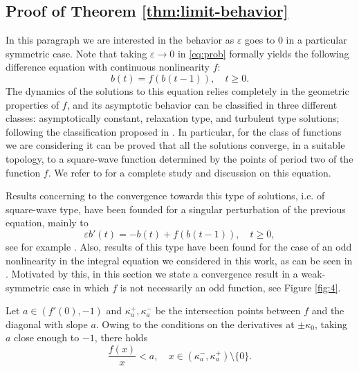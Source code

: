 \documentclass[a4paper,11pt]{article}
\theoremstyle{plain}
\theoremstyle{definition}
\theoremstyle{definition}
\numberwithin{equation}{section}
\begin{document}
\subsection{Proof of Theorem \ref{thm:limit-behavior}}

In this paragraph we are interested in the behavior as $\varepsilon$ goes to 0 in a particular symmetric case. Note that taking $\varepsilon\to 0$ in \eqref{eq:prob} formally yields the following difference equation with continuous nonlinearity $f$: 
\[
    b(t) = f(b(t-1)), \quad t\geq 0.
\]
The dynamics of the solutions to this equation relies completely in the geometric properties of $f$, and its asymptotic behavior can be classified in three different classes: asymptotically constant, relaxation type, and turbulent type solutions; following the classification proposed in \cite{sharkovsky2}. In particular, for the class of functions we are considering it can be proved that all the solutions converge, in a suitable topology, to a square-wave function determined by the points of period two of the function $f$. We refer to  \cite{sharkovsky1} for a complete study and discussion on this equation.

Results concerning to the convergence towards this type of solutions, i.e. of square-wave type, have been founded for a singular perturbation of the previous equation, mainly to
\[
    \varepsilon b'(t) = -b(t) + f(b(t-1)), \quad t\geq 0,
\]
see for example \cite{sharkovsky1,nussbaum_mallet}. Also, results of this type have been found for the case of an odd nonlinearity in the integral equation we considered in this work, as can be seen in \cite{CDM}. Motivated by this, in this section we state a convergence result in a weak-symmetric case in which $f$ is not necessarily an odd function, see Figure \ref{fig:4}.

Let $a\in (f'(0),-1)$ and $\kappa_a^+,\kappa_a^-$ be the intersection points between $f$ and the diagonal with slope $a$. Owing to the conditions on the derivatives at $\pm \kappa_0$, taking $a$ close enough to $-1$, there  holds
\begin{equation}\label{eq:diag_condition2}
    \frac{f(x)}{x} < a, \quad x \in(\kappa_a^-, \kappa_a^+) \setminus\{0\}.
\end{equation}
\end{document}
